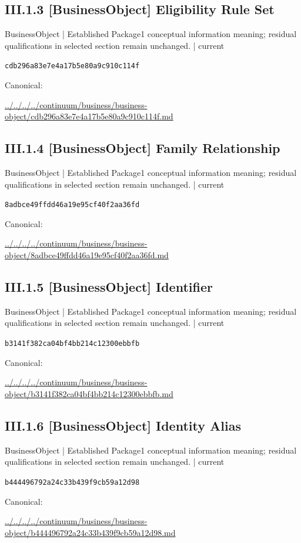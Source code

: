 \documentclass[10pt,a4paper]{article}
\begin{document}
\subsection*{III.1.3 [BusinessObject] Eligibility Rule Set}
\label{element-cdb296a83e7e4a17b5e80a9c910c114f}
{\small BusinessObject | Established Package1 conceptual information meaning; residual qualifications in selected section remain unchanged. | current}\par
\texttt{cdb296a83e7e4a17b5e80a9c910c114f}\par
Canonical: \par
{\footnotesize\url{../../../../continuum/business/business-object/cdb296a83e7e4a17b5e80a9c910c114f.md}}\par
\subsection*{III.1.4 [BusinessObject] Family Relationship}
\label{element-8adbce49ffdd46a19e95cf40f2aa36fd}
{\small BusinessObject | Established Package1 conceptual information meaning; residual qualifications in selected section remain unchanged. | current}\par
\texttt{8adbce49ffdd46a19e95cf40f2aa36fd}\par
Canonical: \par
{\footnotesize\url{../../../../continuum/business/business-object/8adbce49ffdd46a19e95cf40f2aa36fd.md}}\par
\subsection*{III.1.5 [BusinessObject] Identifier}
\label{element-b3141f382ca04bf4bb214c12300ebbfb}
{\small BusinessObject | Established Package1 conceptual information meaning; residual qualifications in selected section remain unchanged. | current}\par
\texttt{b3141f382ca04bf4bb214c12300ebbfb}\par
Canonical: \par
{\footnotesize\url{../../../../continuum/business/business-object/b3141f382ca04bf4bb214c12300ebbfb.md}}\par
\subsection*{III.1.6 [BusinessObject] Identity Alias}
\label{element-b444496792a24c33b439f9cb59a12d98}
{\small BusinessObject | Established Package1 conceptual information meaning; residual qualifications in selected section remain unchanged. | current}\par
\texttt{b444496792a24c33b439f9cb59a12d98}\par
Canonical: \par
{\footnotesize\url{../../../../continuum/business/business-object/b444496792a24c33b439f9cb59a12d98.md}}\par
\end{document}
